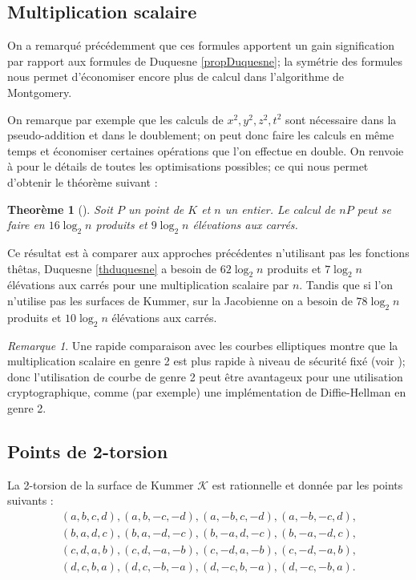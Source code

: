 \documentclass[a4paper]{article}
\newtheorem{theoreme}{Theorème}[section]
\theoremstyle{definition}
\theoremstyle{remark}
\newtheorem{remarque}{Remarque}
\numberwithin{equation}{section}
\begin{document}
\subsection{Multiplication scalaire}

On a remarqué précédemment que ces formules apportent un gain signification par rapport aux formules de Duquesne \ref{propDuquesne}; la symétrie des formules nous permet d'économiser encore plus de calcul dans l'algorithme de Montgomery.

On remarque par exemple que les calculs de $x^2,y^2,z^2,t^2$ sont nécessaire dans la pseudo-addition et dans le doublement; on peut donc faire les calculs en même temps et économiser certaines opérations que l'on effectue en double. On renvoie à \citep{gaudry} pour le détails de toutes les optimisations possibles; ce qui nous permet d'obtenir le théorème suivant :
\begin{theoreme}[\citet{gaudry}]
Soit $P$ un point de $K$ et $n$ un entier. Le calcul de $nP$ peut se faire en $16\log_2 n$ produits et $9\log_2 n$ élévations aux carrés.
\end{theoreme}

Ce résultat est à comparer aux approches précédentes n'utilisant pas les fonctions thêtas, Duquesne \ref{thduquesne} a besoin de $62\log_2 n$ produits et $7\log_2 n$ élévations aux carrés pour une multiplication scalaire par $n$. Tandis que si l'on n'utilise pas les surfaces de Kummer, sur la Jacobienne on a besoin de $78\log_2 n$ produits et $10\log_2 n$ élévations aux carrés.

\begin{remarque}
Une rapide comparaison avec les courbes elliptiques montre que la multiplication scalaire en genre 2 est plus rapide à niveau de sécurité fixé (voir \citet[5.5]{gaudry}); donc l'utilisation de courbe de genre 2 peut être avantageux pour une utilisation cryptographique, comme (par exemple) une implémentation de Diffie-Hellman en genre 2.
\end{remarque}

\subsection{Points de 2-torsion}

La 2-torsion de la surface de Kummer $\mathcal{K}$ est rationnelle et donnée par les points suivants :
\begin{align*}
   &(a,b,c,d),(a,b,-c,-d),(a,-b,c,-d),(a,-b,-c,d),& \\
   &(b,a,d,c),(b,a,-d,-c),(b,-a,d,-c),(b,-a,-d,c),& \\
   &(c,d,a,b),(c,d,-a,-b),(c,-d,a,-b),(c,-d,-a,b),& \\
   &(d,c,b,a),(d,c,-b,-a),(d,-c,b,-a),(d,-c,-b,a).&
\end{align*}
\end{document}
